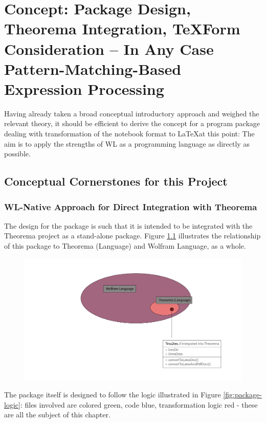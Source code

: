 \chapter{Concept: Package Design, Theorema Integration, TeXForm Consideration – In Any Case Pattern-Matching-Based Expression Processing}
\label{cha:Concept}

Having already taken a broad conceptual introductory approach and weighed the relevant theory, it should be efficient to derive the concept for a program package dealing with transformation of the notebook format to \LaTeX at this point: The aim is to apply the strengths of WL as a programming language as directly as possible.

\section{Conceptual Cornerstones for this Project}

\subsection{WL-Native Approach for Direct Integration with Theorema}

The design for the package is such that it is intended to be integrated with the Theorema project as a stand-alone package. Figure \ref{fig:hierary} illustrates the relationship of this package to Theorema (Language) and Wolfram Language, as a whole.

\begin{figure}[h]
    \centering
    \includegraphics[scale=.35]{images/concept/Tma2Tex-Hierarchy.png}
    \caption{}
    \label{fig:hierary}
\end{figure}

The package itself is designed to follow the logic illustrated in Figure \ref{fig:package-logic}: files involved are colored green, code blue, transformation logic red - these are all the subject of this chapter.

